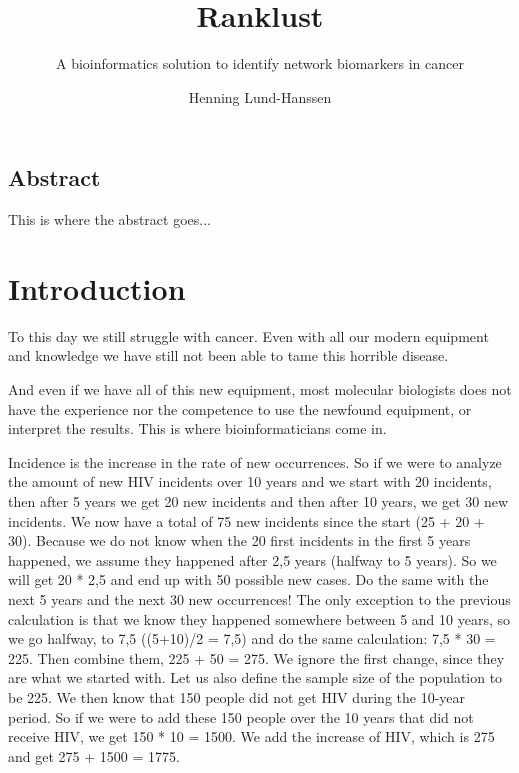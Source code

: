 \documentclass[UKenglish]{ifimaster}
\title{Ranklust}
\subtitle{A bioinformatics solution to identify network biomarkers in cancer}
\author{Henning Lund-Hanssen}
\begin{document}
\ififorside{}
\frontmatter{}
\maketitle{}

\chapter*{Abstract}
This is where the abstract goes...

\tableofcontents{}
\listoffigures{}
\listoftables{}

\mainmatter{}

\part{Introduction}
To this day we still struggle with cancer. Even with all our modern equipment
and knowledge we have still not been able to tame this horrible disease. 

And even if we have all of this new equipment, most molecular biologists does
not have the experience nor the competence to use the newfound equipment, or
interpret the results. This is where bioinformaticians come in. 

Incidence is the increase in the rate of new occurrences. So if we were to
analyze the amount of new HIV incidents over 10 years and we start with 20
incidents, then after 5 years we get 20 new incidents and then after 10 years,
we get 30 new incidents. We now have a total of 75 new incidents since the start
(25 + 20 + 30).  Because we do not know when the 20 first incidents in the first
5 years happened, we assume they happened after 2,5 years (halfway to 5 years).
So we will get 20 * 2,5 and end up with 50 possible new cases. Do the same with
the next 5 years and the next 30 new occurrences! The only exception to the
previous calculation is that we know they happened somewhere between 5 and 10
years, so we go halfway, to 7,5 ((5+10)/2 = 7,5) and do the same calculation:
7,5 * 30 = 225. Then combine them, 225 + 50 = 275. We ignore the first change,
since they are what we started with. Let us also define the sample size of the
population to be 225. We then know that 150 people did not get HIV during the
10-year period. So if we were to add these 150 people over the 10 years that did
not receive HIV, we get 150 * 10 = 1500. We add the increase of HIV, which is
275 and get 275 + 1500 = 1775. 
\end{document}
